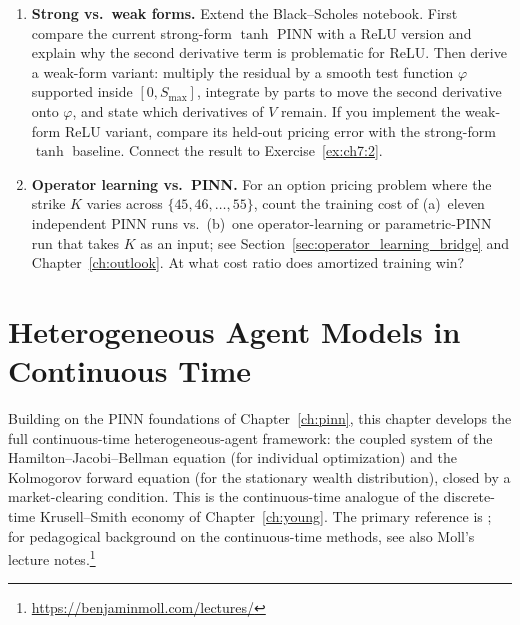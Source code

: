 \documentclass[11pt,a4paper]{report}
\begin{document}
\begin{enumerate}[itemsep=4pt, leftmargin=*]
\item\label{ex:ch7:6} \textbf{Strong vs.\ weak forms.}  Extend the Black--Scholes notebook.  First compare the current strong-form $\tanh$ PINN with a ReLU version and explain why the second derivative term is problematic for ReLU.  Then derive a weak-form variant: multiply the residual by a smooth test function $\varphi$ supported inside $[0,S_\mathrm{max}]$, integrate by parts to move the second derivative onto $\varphi$, and state which derivatives of $V$ remain.  If you implement the weak-form ReLU variant, compare its held-out pricing error with the strong-form $\tanh$ baseline.  Connect the result to Exercise~\ref{ex:ch7:2}.
\item\label{ex:ch7:7} \textbf{Operator learning vs.\ PINN.}  For an option pricing problem where the strike $K$ varies across $\{45,46,\ldots,55\}$, count the training cost of (a)~eleven independent PINN runs vs.\ (b)~one operator-learning or parametric-PINN run that takes $K$ as an input; see Section~\ref{sec:operator_learning_bridge} and Chapter~\ref{ch:outlook}.  At what cost ratio does amortized training win?
\end{enumerate}

\chapter[Continuous-Time Heterogeneous Agent Models]{Heterogeneous Agent Models in Continuous Time}
\label{ch:ct_theory}

Building on the PINN foundations of Chapter~\ref{ch:pinn}, this chapter develops the full continuous-time heterogeneous-agent framework: the coupled system of the Hamilton--Jacobi--Bellman equation (for individual optimization) and the Kolmogorov forward equation (for the stationary wealth distribution), closed by a market-clearing condition.  This is the continuous-time analogue of the discrete-time Krusell--Smith economy of Chapter~\ref{ch:young}.  The primary reference is \citet{achdou2022income}; for pedagogical background on the continuous-time methods, see also Moll's lecture notes.\footnote{\url{https://benjaminmoll.com/lectures/}}
\end{document}

